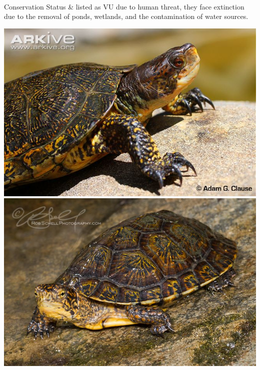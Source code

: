 \begin{center}
\begin{longtabu}
	\\
	\hline
	Conservation Status & 
	listed as VU due to human threat, they face extinction due to the removal of ponds, wetlands, and the contamination of water sources.
	\\
	\hline
\end{longtabu}
\includegraphics[scale=0.5]{testudines/emydidae/actinemys/1}
\includegraphics[scale=0.25]{testudines/emydidae/actinemys/3}
\end{center}